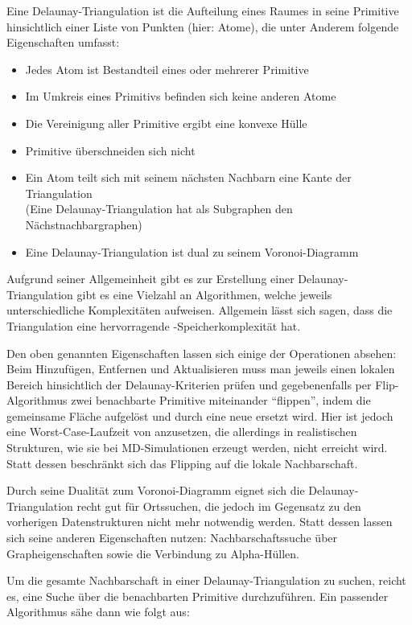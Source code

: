
Eine Delaunay-Triangulation ist die Aufteilung eines Raumes in seine Primitive hinsichtlich einer Liste von Punkten (hier: Atome), die unter Anderem folgende Eigenschaften umfasst:

\begin{itemize}
\item Jedes Atom ist Bestandteil eines oder mehrerer Primitive
\item Im Umkreis eines Primitivs befinden sich keine anderen Atome
\item Die Vereinigung aller Primitive ergibt eine konvexe Hülle
\item Primitive überschneiden sich nicht
\item Ein Atom teilt sich mit seinem nächsten Nachbarn eine Kante der Triangulation \\
(Eine Delaunay-Triangulation hat als Subgraphen den Nächstnachbargraphen)
\item Eine Delaunay-Triangulation ist dual zu seinem Voronoi-Diagramm
\end{itemize}

Aufgrund seiner Allgemeinheit gibt es zur Erstellung einer Delaunay-Triangulation gibt es eine Vielzahl an Algorithmen, welche jeweils unterschiedliche Komplexitäten aufweisen.
Allgemein lässt sich sagen, dass die Triangulation eine hervorragende -Speicherkomplexität hat.

Den oben genannten Eigenschaften lassen sich einige der Operationen absehen:
Beim Hinzufügen, Entfernen und Aktualisieren muss man jeweils einen lokalen Bereich hinsichtlich der Delaunay-Kriterien prüfen und gegebenenfalls per Flip-Algorithmus zwei benachbarte Primitive miteinander ``flippen'', indem die gemeinsame Fläche aufgelöst und durch eine neue ersetzt wird.
Hier ist jedoch eine Worst-Case-Laufzeit von  anzusetzen, die allerdings in realistischen Strukturen, wie sie bei MD-Simulationen erzeugt werden, nicht erreicht wird.
Statt dessen beschränkt sich das Flipping auf die lokale Nachbarschaft.

Durch seine Dualität zum Voronoi-Diagramm eignet sich die Delaunay-Triangulation recht gut für Ortssuchen, die jedoch im Gegensatz zu den vorherigen Datenstrukturen nicht mehr notwendig werden.
Statt dessen lassen sich seine anderen Eigenschaften nutzen: Nachbarschaftssuche über Grapheigenschaften sowie die Verbindung zu Alpha-Hüllen.

Um die gesamte Nachbarschaft in einer Delaunay-Triangulation zu suchen, reicht es, eine Suche über die benachbarten Primitive durchzuführen.
Ein passender Algorithmus sähe dann wie folgt aus:

